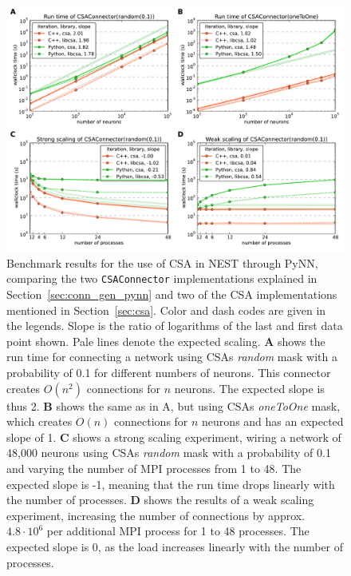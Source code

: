 \documentclass{frontiersSCNS} %
\newcommand{\INLINEFIGS}{} %
\begin{document}
\ifdefined\INLINEFIGS
\begin{figure}[ht]
\centering
\includegraphics[scale=.7]{benchmarks/CSAConnector.pdf}
\caption{Benchmark results for the use of CSA in NEST through PyNN,
  comparing the two \texttt{CSAConnector} implementations explained in
  Section~\ref{sec:conn_gen_pynn} and two of the CSA implementations
  mentioned in Section~\ref{sec:csa}. Color and dash codes are given
  in the legends. Slope is the ratio of logarithms of the last and
  first data point shown. Pale lines denote the expected
  scaling. \textbf{A} shows the run time for connecting a network
  using CSAs \emph{random} mask with a probability of 0.1 for
  different numbers of neurons. This connector creates $O(n^2)$
  connections for $n$ neurons. The expected slope is thus
  2. \textbf{B} shows the same as in A, but using CSAs \emph{oneToOne}
  mask, which creates $O(n)$ connections for $n$ neurons and has an
  expected slope of 1. \textbf{C} shows a strong scaling experiment,
  wiring a network of 48,000 neurons using CSAs \emph{random} mask
  with a probability of 0.1 and varying the number of MPI processes
  from 1 to 48. The expected slope is -1, meaning that the run time
  drops linearly with the number of processes. \textbf{D} shows the
  results of a weak scaling experiment, increasing the number of
  connections by approx. $4.8 \cdot 10^6$ per additional MPI process
  for 1 to 48 processes. The expected slope is 0, as the load
  increases linearly with the number of
  processes.}\label{fig:pynn_benchmarks}
\end{figure}
\fi
\end{document}
